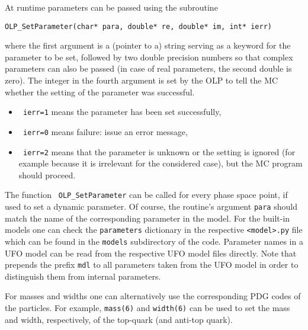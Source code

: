 At runtime parameters can be passed using the subroutine
\begin{lstlisting}[style=C]
      OLP_SetParameter(char* para, double* re, double* im, int* ierr)
\end{lstlisting}
where the first argument is a (pointer to a) string serving as a keyword for the parameter to be set, followed by two double precision numbers
so that complex parameters can also be passed (in case of real parameters, the second double is zero). The integer in the fourth argument is set by the OLP to tell the MC whether the setting of the parameter was successful.
\begin{itemize}
      \item \texttt{ ierr=1} means the parameter has been set successfully,
      \item \texttt{ ierr=0} means failure: issue an error message,
      \item \texttt{ ierr=2} means that the parameter is unknown or the setting is ignored (for example because it is irrelevant for the considered case), but the MC program should proceed.
\end{itemize}
The function \texttt{ OLP\_SetParameter} can be called for every phase space point, if used to set a dynamic parameter. Of course, the routine's argument \texttt{para} should match the name of the corresponding parameter in the model. For the built-in models one can check the \texttt{parameters} dictionary in the respective \texttt{<model>.py} file which can be found in the \texttt{models} subdirectory of the \gosam code. Parameter names in a UFO model can be read from the respective UFO model files directly. Note that \gosam prepends the prefix \texttt{mdl} to all parameters taken from the UFO model in order to distinguish them from internal parameters.

For masses and widths one can alternatively use the corresponding PDG codes of the particles. For example, \texttt{mass(6)} and \texttt{width(6)} can be used to set the mass and width, respectively, of the top-quark (and anti-top quark).



